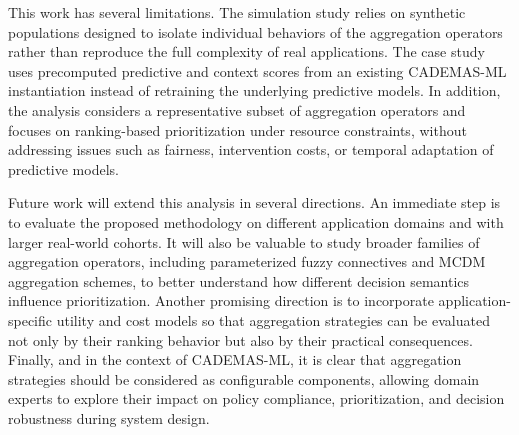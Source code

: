 \documentclass[mathematics,article,submit,moreauthors]{Definitions/mdpi}
\begin{document}
This work has several limitations. The simulation study relies on synthetic populations designed to isolate individual behaviors of the aggregation operators rather than reproduce the full complexity of real applications. The case study uses precomputed predictive and context scores from an existing CADEMAS-ML instantiation instead of retraining the underlying predictive models. In addition, the analysis considers a representative subset of aggregation operators and focuses on ranking-based prioritization under resource constraints, without addressing issues such as fairness, intervention costs, or temporal adaptation of predictive models.

Future work will extend this analysis in several directions. An immediate step is to evaluate the proposed methodology on different application domains and with larger real-world cohorts. It will also be valuable to study broader families of aggregation operators, including parameterized fuzzy connectives and MCDM aggregation schemes, to better understand how different decision semantics influence prioritization. Another promising direction is to incorporate application-specific utility and cost models so that aggregation strategies can be evaluated not only by their ranking behavior but also by their practical consequences. Finally, and in the context of CADEMAS-ML, it is clear that  aggregation strategies should be considered as configurable components, allowing domain experts to explore their impact on policy compliance, prioritization, and decision robustness during system design.





\end{document}
